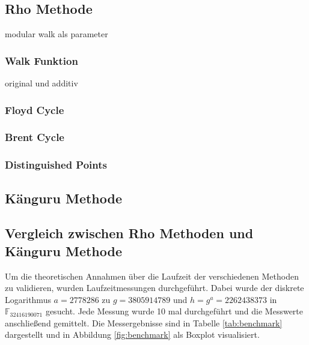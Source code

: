 \documentclass{scrartcl}
\begin{document}
\cite{Galbraith2012}

\subsection{Rho Methode}
\label{sec:rho}

modular walk als parameter

\cite{Galbraith2012}

\subsubsection{Walk Funktion}
\label{sec:walk_funktion}
original und additiv

\subsubsection{Floyd Cycle}
\label{sec:floyd_cycle}


\subsubsection{Brent Cycle}
\label{sec:brent_cycle}

\cite{Brent1980}

\subsubsection{Distinguished Points}
\label{sec:distinguished_points}


\cite{VanOorschot1999}

\subsection{Känguru Methode}
\label{sec:kaenguru}

\subsection{Vergleich zwischen Rho Methoden und Känguru Methode}
Um die theoretischen Annahmen über die Laufzeit der verschiedenen Methoden
zu validieren, wurden Laufzeitmessungen durchgeführt.
Dabei wurde der diskrete Logarithmus \( a = 2778286 \) zu \( g = 3805914789 \)
und \(h = g^a = 2262438373 \) in \( \mathbb{F}_{32416190071} \) gesucht.
Jede Messung wurde 10 mal durchgeführt und die Messwerte anschließend gemittelt.
Die Messergebnisse sind in Tabelle \ref{tab:benchmark} dargestellt und
in Abbildung \ref{fig:benchmark} als Boxplot visualisiert.
\end{document}
